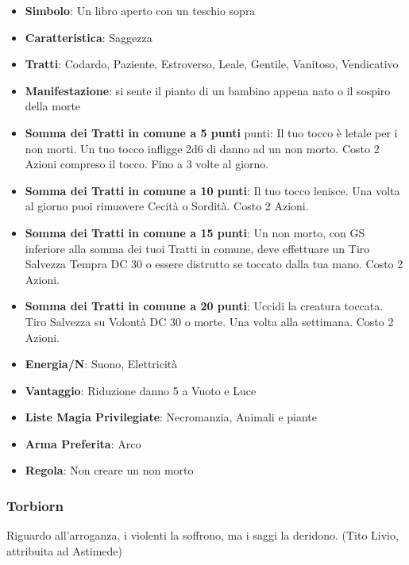 \begin{multicols}{2}
\begin{itemize}[leftmargin=*] \setlength{\itemsep}{0pt}
\item \textbf{Simbolo}: Un libro aperto con un teschio sopra
\item \textbf{Caratteristica}: Saggezza
\item \textbf{Tratti}: Codardo, Paziente, Estroverso, Leale, Gentile, Vanitoso, Vendicativo
\item \textbf{Manifestazione}: si sente il pianto di un bambino appena nato o il sospiro della morte
\item \textbf{Somma dei Tratti in comune a 5 punti} punti: Il tuo tocco è letale per i non morti. Un tuo tocco infligge 2d6 di danno ad un non morto. Costo 2 Azioni compreso il tocco. Fino a 3 volte al giorno.
\item \textbf{Somma dei Tratti in comune a 10 punti}: Il tuo tocco lenisce. Una volta al giorno puoi rimuovere Cecità o Sordità. Costo 2 Azioni.
\item \textbf{Somma dei Tratti in comune a 15 punti}: Un non morto, con GS inferiore alla somma dei tuoi Tratti in comune, deve effettuare un Tiro Salvezza Tempra DC 30 o essere distrutto se toccato dalla tua mano. Costo 2 Azioni.
\item \textbf{Somma dei Tratti in comune a 20 punti}: Uccidi la creatura toccata. Tiro Salvezza su Volontà DC 30 o morte. Una volta alla settimana. Costo 2 Azioni.
\item \textbf{Energia/N}: Suono, Elettricità
\item \textbf{Vantaggio}: Riduzione danno 5 a Vuoto e Luce
\item \textbf{Liste Magia Privilegiate}: Necromanzia, Animali e piante
\item \textbf{Arma Preferita}: Arco
\item \textbf{Regola}: Non creare un non morto
\end{itemize}

\subsubsection{Torbiorn}\label{torbion}\hypertarget{torbiorn}{}

\begin{changemargin}{0.3cm}{0.3cm}\begin{enfasi}{
Riguardo all'arroganza, i violenti la soffrono, ma i saggi la deridono. (Tito Livio, attribuita ad Astimede)
}\end{enfasi}\end{changemargin}\medskip



\end{multicols}
